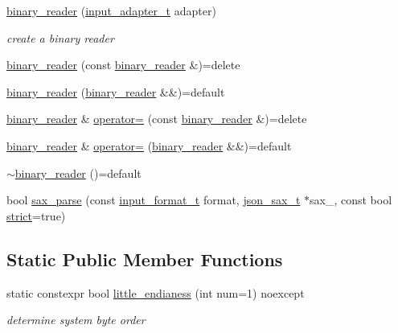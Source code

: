 \begin{DoxyCompactItemize}
\item 
\mbox{\hyperlink{classnlohmann_1_1detail_1_1binary__reader_aed84f0302eb232d3b69f7653bef2337a}{binary\+\_\+reader}} (\mbox{\hyperlink{namespacenlohmann_1_1detail_ae132f8cd5bb24c5e9b40ad0eafedf1c2}{input\+\_\+adapter\+\_\+t}} adapter)
\begin{DoxyCompactList}\small\item\em create a binary reader \end{DoxyCompactList}\item 
\mbox{\hyperlink{classnlohmann_1_1detail_1_1binary__reader_aacbece7dfa1698dfb3f22c90922d7244}{binary\+\_\+reader}} (const \mbox{\hyperlink{classnlohmann_1_1detail_1_1binary__reader}{binary\+\_\+reader}} \&)=delete
\item 
\mbox{\hyperlink{classnlohmann_1_1detail_1_1binary__reader_a254d91b10c2f4579634b6f70ffc1ef16}{binary\+\_\+reader}} (\mbox{\hyperlink{classnlohmann_1_1detail_1_1binary__reader}{binary\+\_\+reader}} \&\&)=default
\item 
\mbox{\hyperlink{classnlohmann_1_1detail_1_1binary__reader}{binary\+\_\+reader}} \& \mbox{\hyperlink{classnlohmann_1_1detail_1_1binary__reader_a87826b833ee7fec146c97233bb0f6ab8}{operator=}} (const \mbox{\hyperlink{classnlohmann_1_1detail_1_1binary__reader}{binary\+\_\+reader}} \&)=delete
\item 
\mbox{\hyperlink{classnlohmann_1_1detail_1_1binary__reader}{binary\+\_\+reader}} \& \mbox{\hyperlink{classnlohmann_1_1detail_1_1binary__reader_a7ba0e555da725a2efa17048e67aec9a9}{operator=}} (\mbox{\hyperlink{classnlohmann_1_1detail_1_1binary__reader}{binary\+\_\+reader}} \&\&)=default
\item 
\mbox{\hyperlink{classnlohmann_1_1detail_1_1binary__reader_a18e0a63e22dbdad5f6964276b81b813a}{$\sim$binary\+\_\+reader}} ()=default
\item 
bool \mbox{\hyperlink{classnlohmann_1_1detail_1_1binary__reader_ab94a54d6e595c2620b07589cf4116256}{sax\+\_\+parse}} (const \mbox{\hyperlink{namespacenlohmann_1_1detail_aa554fc6a11519e4f347deb25a9f0db40}{input\+\_\+format\+\_\+t}} format, \mbox{\hyperlink{classnlohmann_1_1detail_1_1binary__reader_a43c5dc6a3219f64a7824d7ba9c7b14ae}{json\+\_\+sax\+\_\+t}} $\ast$sax\+\_\+, const bool \mbox{\hyperlink{namespacenlohmann_1_1detail_a5a76b60b26dc8c47256a996d18d967dfa2133fd717402a7966ee88d06f9e0b792}{strict}}=true)
\end{DoxyCompactItemize}
\subsection*{Static Public Member Functions}
\begin{DoxyCompactItemize}
\item 
static constexpr bool \mbox{\hyperlink{classnlohmann_1_1detail_1_1binary__reader_a1e31dbfcf9567c8c2d4f0e4eb1b0230a}{little\+\_\+endianess}} (int num=1) noexcept
\begin{DoxyCompactList}\small\item\em determine system byte order \end{DoxyCompactList}\end{DoxyCompactItemize}
